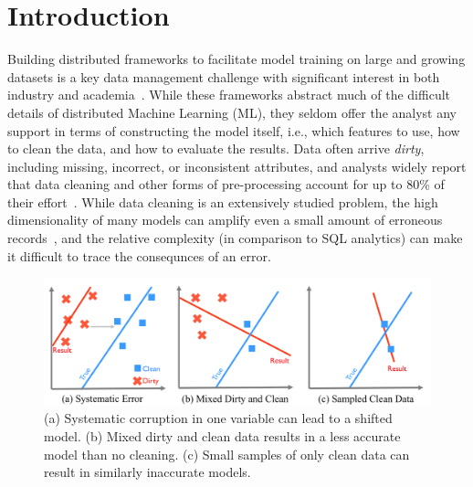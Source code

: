 \section{Introduction}

{\color{red}{Proposed story: 1) ML is a data management problem  2) building models is highly iterative  3) data often coming from logs/sensors, that can be faulty  4) faulty datasources means data is dirty, can affect model 5) data prep/cleaning the inputs is hard, lack of tools to do it.  6) coupled with iterative nature (look for problems, clean some, repeat), process is WRONG.  7) Looking at trends such as deep learning, which is very high dimensional, data cleaning is very important, because models are highly sensitivy 8) want an iterative data prep system targeting ML applications 9) ActiveClean is such a system 10) demo on higgs and video.}}


Building distributed frameworks to facilitate model training on large and growing datasets is a key data management challenge with significant interest in both industry and academia~\cite{bdas, alexandrov2014stratosphere, crotty2014tupleware, tensor}.
While these frameworks abstract much of the difficult details of distributed Machine Learning (ML), they seldom offer the analyst any support in terms of constructing the model itself, i.e., which features to use, how to clean the data, and how to evaluate the results.
Data often arrive \emph{dirty}, including missing, incorrect, or inconsistent attributes, and analysts widely report that data cleaning and other forms of pre-processing account for up to 80\% of their effort~\cite{nytimes, kandel2012}.
While data cleaning is an extensively studied problem, the high dimensionality of many models can amplify even a small amount of erroneous records~\cite{xiaofeature}, and the relative complexity (in comparison to SQL analytics) can make it difficult to trace the consequnces of an error.

\begin{figure}[t]
\centering
 \includegraphics[width=\columnwidth]{figs/update-arch.png}
 \caption{(a) Systematic corruption in one variable can lead to a shifted model. 
 (b) Mixed dirty and clean data results in a less accurate model than no cleaning.
(c) Small samples of only clean data can result in similarly inaccurate models. \label{update-arch1}}
\end{figure}

